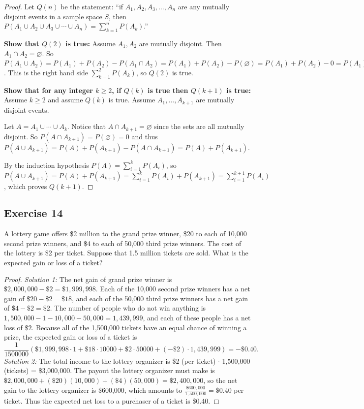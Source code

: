 \documentclass[14pt]{extarticle}
\newcommand{\es}{\varnothing}
\begin{document}
\begin{proof}
     Let \(Q(n)\) be the statement: ``if \(A_1, A_2, A_3, \ldots, A_n\) are any mutually disjoint events in a sample space
     \(S\), then \(P(A_1 \cup A_2 \cup A_3 \cup \cdots \cup A_n) = \sum_{k=1}^n P(A_k)\).''

     {\bf Show that \(Q(2)\) is true:} Assume \(A_1, A_2\) are mutually disjoint. Then \(A_1 \cap A_2 = \es\). So
     \(P(A_1 \cup A_2) = P(A_1) + P(A_2) - P(A_1 \cap A_2) = P(A_1) + P(A_2) - P(\es) = P(A_1) + P(A_2) - 0 = P(A_1) + P(A_2)\).
     This is the right hand side \(\sum_{k=1}^2 P(A_k)\), so \(Q(2)\) is true.

          {\bf Show that for any integer \(k \geq 2\), if \(Q(k)\) is true then \(Q(k+1)\) is true:} Assume \(k \geq 2\) and assume
     \(Q(k)\) is true. Assume \(A_1, \ldots, A_{k+1}\) are mutually disjoint events.

     Let \(A = A_1 \cup \cdots \cup A_k\). Notice that \(A \cap A_{k+1} = \es\) since the sets are all mutually disjoint. So
     \(P(A \cap A_{k+1})= P(\es) = 0\) and thus \(P(A \cup A_{k+1}) = P(A) + P(A_{k+1}) - P(A \cap A_{k+1}) = P(A) + P(A_{k+1})\).

     By the induction hypothesis \(P(A) = \sum_{i=1}^k P(A_i)\), so \(P(A \cup A_{k+1}) = P(A) + P(A_{k+1}) = \sum_{i=1}^k P(A_i)
     + P(A_{k+1}) = \sum_{i=1}^{k+1} P(A_i)\), which proves \(Q(k+1)\).
\end{proof}

\subsection{Exercise 14}
A lottery game offers \$2 million to the grand prize winner, \$20 to each of 10,000 second prize winners, and \$4 to each of
50,000 third prize winners. The cost of the lottery is \$2 per ticket. Suppose that 1.5 million tickets are sold. What is the
expected gain or loss of a ticket?

\begin{proof}
     {\it Solution 1:} The net gain of grand prize winner is \(\$2,000,000 - \$2 = \$1,999,998\). Each of the 10,000 second
     prize winners has a net gain of \(\$20 - \$2 = \$18\), and each of the 50,000 third prize winners has a net gain of \(\$4
     - \$2 = \$2\). The number of people who do not win anything is \(1,500,000 - 1 - 10,000 - 50,000 = 1,439,999\), and each of
     these people has a net loss of \(\$2\). Because all of the 1,500,000 tickets have an equal chance of winning a prize, the
     expected gain or loss of a ticket is
     \[
          \frac{1}{1500000}(\$1,999,998 \cdot 1 + \$18 \cdot 10000 + \$2 \cdot 50000 + (-\$2) \cdot 1,439,999) = -\$0.40.
     \]
     {\it Solution 2:} The total income to the lottery organizer is \$2 (per ticket) \(\cdot\) 1,500,000 (tickets) = \$3,000,000.
     The payout the lottery organizer must make is \(\$2,000,000 + (\$20)(10,000) + (\$4)(50,000) = \$2,400,000\), so the net
     gain to the lottery organizer is \$600,000, which amounts to \(\frac{\$600,000}{1,500,000} = \$0.40\) per ticket. Thus the
     expected net loss to a purchaser of a ticket is \$0.40.
\end{proof}
\end{document}
